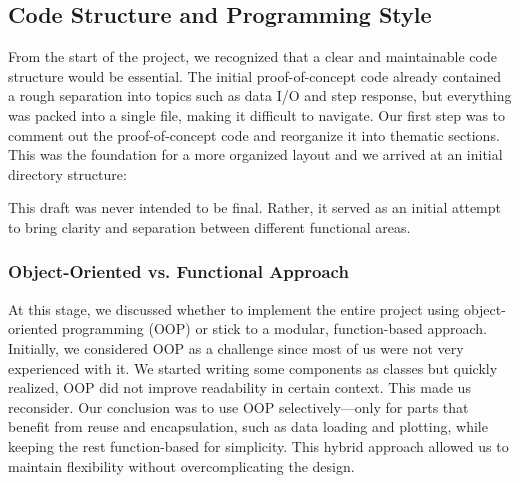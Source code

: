 \documentclass[a4paper,11pt]{scrartcl}
\begin{document}
\clearpage

\subsection{Code Structure and Programming Style}
From the start of the project, we recognized that a clear and maintainable code structure would be essential.
The initial proof-of-concept code already contained a rough separation into topics such as data I/O and step response,
but everything was packed into a single file, making it difficult to navigate.
Our first step was to comment out the proof-of-concept code and reorganize it into thematic sections.
This was the foundation for a more organized layout and we arrived at an initial directory structure:
\\

This draft was never intended to be final. Rather, it served as an initial attempt to bring clarity and separation between different functional areas.

\clearpage

\subsubsection*{Object-Oriented vs. Functional Approach}
At this stage, we discussed whether to implement the entire project using object-oriented programming (OOP) or stick to a modular,
function-based approach. Initially, we considered OOP as a challenge since most of us were not very experienced with it.
We started writing some components as classes but quickly realized, OOP did not improve readability in certain context. This made us reconsider.
Our conclusion was to use OOP selectively—only for parts that benefit from reuse and encapsulation, such as data loading and plotting,
while keeping the rest function-based for simplicity. This hybrid approach allowed us to maintain flexibility without overcomplicating the design.
\end{document}
